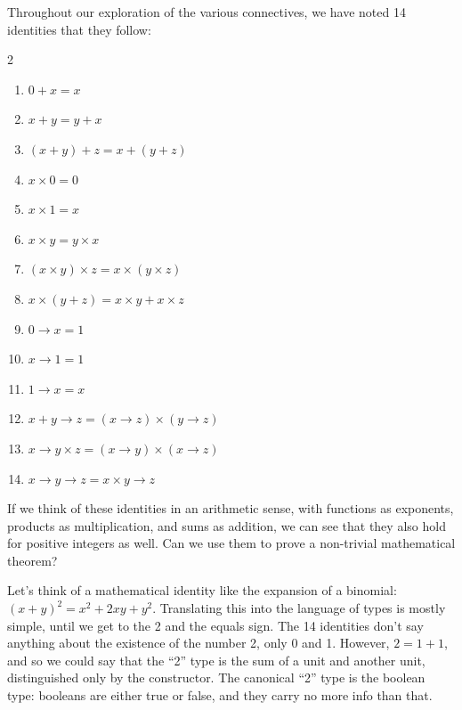 \documentclass[12pt]{article}
\begin{document}
Throughout our exploration of the various connectives, we have noted 14 identities that they follow:

\begin{multicols}{2}
    \begin{enumerate}
        \item $0 + x = x$
        \item $x + y = y + x$
        \item $(x + y) + z = x + (y + z)$
        \item $x \times 0 = 0$
        \item $x \times 1 = x$
        \item $x \times y = y \times x$
        \item $(x \times y) \times z = x \times (y \times z)$
        \item $x \times (y + z) = x \times y + x \times z$
        \item $0 \to x = 1$
        \item $x \to 1 = 1$
        \item $1 \to x = x$
        \item $x + y \to z = (x \to z) \times (y \to z)$
        \item $x \to y \times z = (x \to y) \times (x \to z)$
        \item $x \to y \to z = x \times y \to z$
    \end{enumerate}
\end{multicols}

If we think of these identities in an arithmetic sense, with functions as exponents, products as multiplication, and sums as addition, we can see that they also hold for positive integers as well. Can we use them to prove a non-trivial mathematical theorem?


Let's think of a mathematical identity like the expansion of a binomial: $(x + y)^2 = x^2 + 2xy + y^2$. Translating this into the language of types is mostly simple, until we get to the 2 and the equals sign. The 14 identities don't say anything about the existence of the number 2, only 0 and 1. However, $2 = 1 + 1$, and so we could say that the ``2'' type is the sum of a unit and another unit, distinguished only by the constructor. The canonical ``2'' type is the boolean type: booleans are either true or false, and they carry no more info than that.
\end{document}
